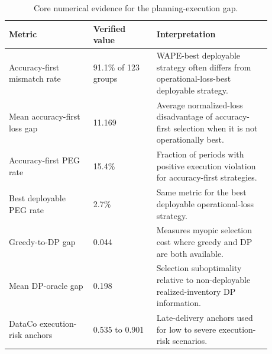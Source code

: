\begin{table}[htbp]
\centering
\caption{Core numerical evidence for the planning-execution gap.}
\label{tab:core-results}
\small
\begin{tabular}{@{}p{0.29\linewidth}p{0.21\linewidth}p{0.38\linewidth}@{}}
\toprule
\textbf{Metric} & \textbf{Verified value} & \textbf{Interpretation} \\
\midrule
Accuracy-first mismatch rate & 91.1\% of 123 groups & WAPE-best deployable strategy often differs from operational-loss-best deployable strategy. \\
Mean accuracy-first loss gap & 11.169 & Average normalized-loss disadvantage of accuracy-first selection when it is not operationally best. \\
Accuracy-first PEG rate & 15.4\% & Fraction of periods with positive execution violation for accuracy-first strategies. \\
Best deployable PEG rate & 2.7\% & Same metric for the best deployable operational-loss strategy. \\
Greedy-to-DP gap & 0.044 & Measures myopic selection cost where greedy and DP are both available. \\
Mean DP-oracle gap & 0.198 & Selection suboptimality relative to non-deployable realized-inventory DP information. \\
DataCo execution-risk anchors & 0.535 to 0.901 & Late-delivery anchors used for low to severe execution-risk scenarios. \\
\bottomrule
\end{tabular}
\end{table}
